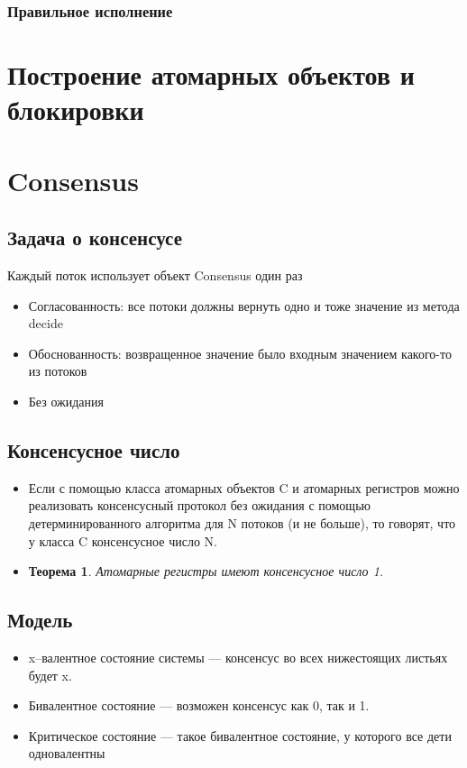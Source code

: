 \documentclass[10pt,a4paper,oneside,titlepage]{article}
\newtheorem{theorem}{Теорема}[section]
\begin{document}
\subsubsection{Правильное исполнение} 


\section{Построение атомарных объектов и блокировки}

\section{Consensus}
\subsection{Задача о консенсусе}

Каждый поток использует объект Consensus один раз

\begin{itemize}
	\item Согласованность: все потоки должны вернуть одно и тоже значение из метода decide
	\item Обоснованность: возвращенное значение было входным значением какого-то из потоков
	\item Без ожидания
\end{itemize}

\subsection{Консенсусное число}
\begin{itemize}
	\item Если с помощью класса атомарных объектов C и атомарных регистров можно реализовать консенсусный протокол без ожидания с помощью детерминированного алгоритма для N потоков (и не больше), то говорят, что у класса C консенсусное число N.
	\item \begin{theorem}
		Атомарные регистры имеют консенсусное число 1.
	\end{theorem} 
\end{itemize}

\subsection{Модель}
\begin{itemize}
	\item x--валентное состояние системы --- консенсус во всех нижестоящих листьях будет x.
	\item Бивалентное состояние --- возможен консенсус как 0, так и 1.
	\item Критическое состояние --- такое бивалентное состояние, у которого все дети одновалентны
\end{itemize}
\end{document}
